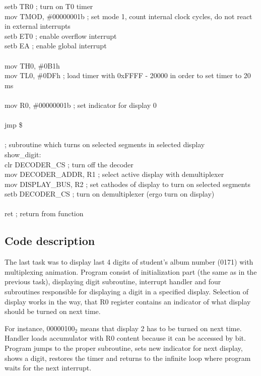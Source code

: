 \documentclass{article}
\begin{document}
    setb    TR0                 ; turn on T0 timer\\
    mov     TMOD, \#00000001b    ; set mode 1, count internal clock cycles, do not react in external interrupts\\
    setb    ET0                 ; enable overflow interrupt\\
    setb    EA                  ; enable global interrupt\\
\\
    mov     TH0, \#0B1h\\
    mov     TL0, \#0DFh          ; load timer with 0xFFFF - 20000 in order to set timer to 20 ms\\
\\
    mov     R0, \#00000001b      ; set indicator for display 0\\
\\
    jmp     \$\\
\\
; subroutine which turns on selected segments in selected display\\
show\_digit:\\
    clr     DECODER\_CS          ; turn off the decoder\\
    mov     DECODER\_ADDR, R1    ; select active display with demultiplexer\\
    mov     DISPLAY\_BUS, R2     ; set cathodes of display to turn on selected segments\\
    setb    DECODER\_CS          ; turn on demultiplexer (ergo turn on display)\\
\\
    ret                         ; return from function

\rmfamily

\newpage

\subsection{Code description}
The last task was to display last 4 digits of student's album number (0171) with multiplexing animation.
Program consist of initialization part (the same as in the previous task), displaying digit subroutine, interrupt handler and 
four subroutines responsible for displaying a digit in a specified display. Selection of display works
in the way, that R0 register contains an indicator of what display should be turned on next time.

For instance, 00000100$_2$ means that display 2 has to be turned on next time. Handler loads accumulator
with R0 content because it can be accessed by bit. Program jumps to the proper subroutine, sets new indicator for next display, shows a digit,
restores the timer and returns to the infinite loop where program waits for the next interrupt.
\end{document}
